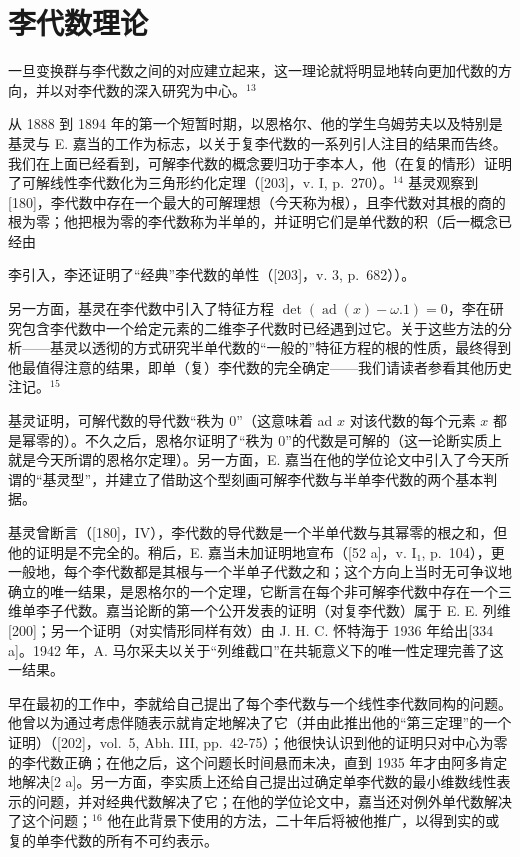 \section{李代数理论}

一旦变换群与李代数之间的对应建立起来，这一理论就将明显地转向更加代数的方向，并以对李代数的深入研究为中心。\(^{13}\)

从 1888 到 1894 年的第一个短暂时期，以恩格尔、他的学生乌姆劳夫以及特别是基灵与 E. 嘉当的工作为标志，以关于复李代数的一系列引人注目的结果而告终。我们在上面已经看到，可解李代数的概念要归功于李本人，他（在复的情形）证明了可解线性李代数化为三角形约化定理（{[}203{]}，v. I, p.~270）。\(^{14}\) 基灵观察到{[}180{]}，李代数中存在一个最大的可解理想（今天称为根），且李代数对其根的商的根为零；他把根为零的李代数称为半单的，并证明它们是单代数的积（后一概念已经由

李引入，李还证明了“经典”李代数的单性（{[}203{]}，v. 3, p.~682））。

另一方面，基灵在李代数中引入了特征方程 \(\det(\operatorname{ad}(x)-\omega.1)=0\)，李在研究包含李代数中一个给定元素的二维李子代数时已经遇到过它。关于这些方法的分析——基灵以透彻的方式研究半单代数的“一般的”特征方程的根的性质，最终得到他最值得注意的结果，即单（复）李代数的完全确定——我们请读者参看其他历史注记。\(^{15}\)

基灵证明，可解代数的导代数“秩为 0”（这意味着 ad \(x\) 对该代数的每个元素 \(x\) 都是幂零的）。不久之后，恩格尔证明了“秩为 0”的代数是可解的（这一论断实质上就是今天所谓的恩格尔定理）。另一方面，E. 嘉当在他的学位论文中引入了今天所谓的“基灵型”，并建立了借助这个型刻画可解李代数与半单李代数的两个基本判据。

基灵曾断言（{[}180{]}，IV），李代数的导代数是一个半单代数与其幂零的根之和，但他的证明是不完全的。稍后，E. 嘉当未加证明地宣布（{[}52 a{]}，v. I₁, p.~104），更一般地，每个李代数都是其根与一个半单子代数之和；这个方向上当时无可争议地确立的唯一结果，是恩格尔的一个定理，它断言在每个非可解李代数中存在一个三维单李子代数。嘉当论断的第一个公开发表的证明（对复李代数）属于 E. E. 列维{[}200{]}；另一个证明（对实情形同样有效）由 J. H. C. 怀特海于 1936 年给出{[}334 a{]}。1942 年，A. 马尔采夫以关于“列维截口”在共轭意义下的唯一性定理完善了这一结果。

早在最初的工作中，李就给自己提出了每个李代数与一个线性李代数同构的问题。他曾以为通过考虑伴随表示就肯定地解决了它（并由此推出他的“第三定理”的一个证明）（{[}202{]}，vol.~5, Abh. III, pp.~42-75）；他很快认识到他的证明只对中心为零的李代数正确；在他之后，这个问题长时间悬而未决，直到 1935 年才由阿多肯定地解决{[}2 a{]}。另一方面，李实质上还给自己提出过确定单李代数的最小维数线性表示的问题，并对经典代数解决了它；在他的学位论文中，嘉当还对例外单代数解决了这个问题；\(^{16}\) 他在此背景下使用的方法，二十年后将被他推广，以得到实的或复的单李代数的所有不可约表示。

